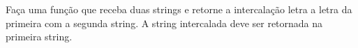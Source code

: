
\question[10]

Faça uma função que receba duas strings e retorne a intercalação letra a letra da primeira com a segunda string. A string intercalada deve ser retornada na primeira string.